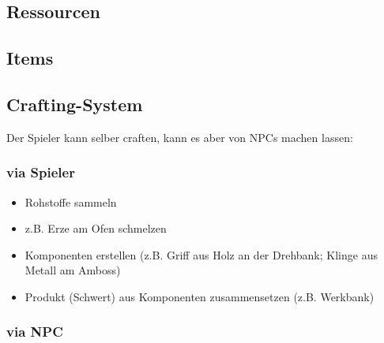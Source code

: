 
\subsection{Ressourcen}
\label{subsec:ressourcen}

\subsection{Items}
\label{subsec:items}

\subsection{Crafting-System}
\label{subsec:crafting-system}
Der Spieler kann selber craften, kann es aber von NPCs machen lassen:
\subsubsection{via Spieler}
\label{subsubsec:spieler-crafting}
	\begin{itemize}
		\item Rohstoffe sammeln
		\item z.B. Erze am Ofen schmelzen
		\item Komponenten erstellen (z.B. Griff aus Holz an der Drehbank; Klinge aus Metall am Amboss)
		\item Produkt (Schwert) aus Komponenten zusammensetzen (z.B. Werkbank)
	\end{itemize}

\subsubsection{via NPC}
\label{subsubsec:NPC-crafting}

